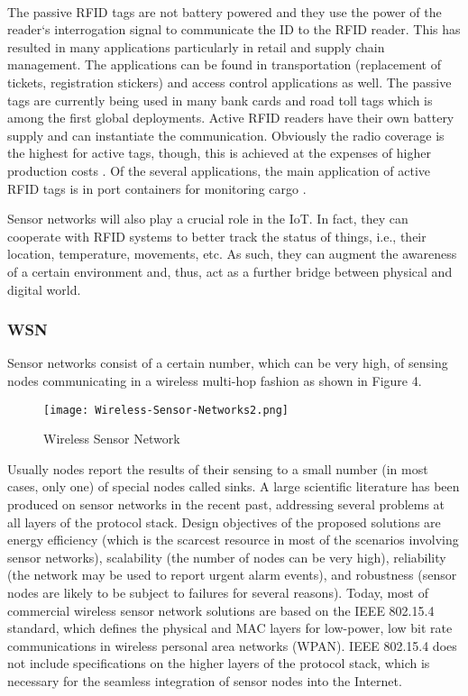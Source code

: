 \documentclass[10pt, twocolumn]{article}
\begin{document}
\paragraph{}
The passive RFID tags are not battery powered and they use the power of the reader‘s interrogation signal to communicate the ID to the RFID reader. This has resulted in many applications particularly in retail and supply chain management. The applications can be found in transportation (replacement of tickets, registration stickers) and access control applications as well. The passive tags are currently being used in many bank cards and road toll tags which is among the first global deployments. Active RFID readers have their own battery supply and can instantiate the communication. Obviously the radio coverage is the highest for active tags, though, this is achieved at the expenses of higher production costs . Of the several applications, the main application of active RFID tags is in port containers for monitoring cargo \cite{ref1}.

Sensor networks will also play a crucial role in the IoT. In fact, they can cooperate with RFID systems to better track the status of things, i.e., their location, temperature, movements, etc. As such, they can augment the awareness of a certain environment and, thus, act as a further bridge between physical and digital world.
\subsubsection{WSN}
Sensor networks consist of a certain number, which can be very high, of sensing nodes communicating in a wireless multi-hop fashion \cite{ref16} as shown in Figure 4.
\begin{figure}
\begin{center}
\texttt{[image: Wireless-Sensor-Networks2.png]}
\end{center}
\caption{Wireless Sensor Network}
\end{figure}
Usually nodes report the results of their sensing to a small number (in most cases, only one) of special nodes called sinks. A large scientific literature has been produced on sensor networks in the recent past, addressing several problems at all layers of the protocol stack. Design objectives of the proposed solutions are energy efficiency (which is the scarcest resource in most of the scenarios involving sensor networks), scalability (the number of nodes can be very high), reliability (the network may be used to report urgent alarm events), and robustness (sensor nodes are likely to be subject to failures for several reasons). Today, most of commercial wireless sensor network solutions are based on the IEEE 802.15.4 standard, which defines the physical and MAC layers for low-power, low bit rate communications in wireless personal area networks (WPAN). IEEE 802.15.4 does not include specifications on the higher layers of the protocol stack, which is necessary for the seamless integration of sensor nodes into the Internet.
\end{document}
